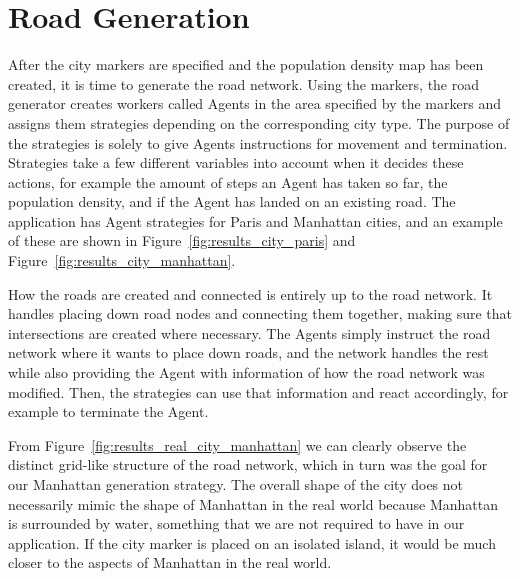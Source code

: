 \section{Road Generation}

After the city markers are specified and the population density map has been created, it is time to generate the road network.
Using the markers, the road generator creates workers called Agents in the area specified by the markers and assigns them strategies depending on the corresponding city type.
The purpose of the strategies is solely to give Agents instructions for movement and termination.
Strategies take a few different variables into account when it decides these actions, for example the amount of steps an Agent has taken so far, the population density, and if the Agent has landed on an existing road.
The application has Agent strategies for Paris and Manhattan cities, and an example of these are shown in Figure~\ref{fig:results_city_paris} and Figure~\ref{fig:results_city_manhattan}.

How the roads are created and connected is entirely up to the road network.
It handles placing down road nodes and connecting them together, making sure that intersections are created where necessary.
The Agents simply instruct the road network where it wants to place down roads, and the network handles the rest while also providing the Agent with information of how the road network was modified.
Then, the strategies can use that information and react accordingly, for example to terminate the Agent.

From Figure~\ref{fig:results_real_city_manhattan} we can clearly observe the distinct grid-like structure of the road network, which in turn was the goal for our Manhattan generation strategy.
The overall shape of the city does not necessarily mimic the shape of Manhattan in the real world because Manhattan is surrounded by water, something that we are not required to have in our application.
If the city marker is placed on an isolated island, it would be much closer to the aspects of Manhattan in the real world.

